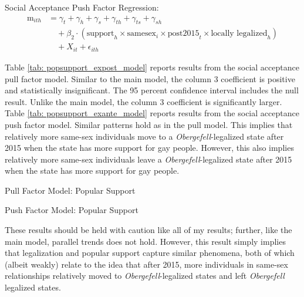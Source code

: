 \documentclass[12pt,letterpaper]{article}
\begin{document}
\hfill
\break
Social Acceptance Push Factor Regression:
\begin{equation}
\begin{aligned}
\text{m}_{ith} &= \gamma_t + \gamma_h + \gamma_s + \gamma_{th} + \gamma_{ts} + \gamma_{sh} \\
&\quad + \beta_2 \cdot (\text{support}_h \times \text{samesex}_i \times \text{post2015}_t \times \text{locally legalized}_h) \\
&\quad + X_{it} + \epsilon_{ith}
\end{aligned}
\end{equation}

Table \ref{tab: popsupport_expost_model} reports results from the social acceptance pull factor model. Similar to the main model, the column 3 coefficient is positive and statistically insignificant. The 95 percent confidence interval includes the null result. Unlike the main model, the column 3 coefficient is significantly larger. Table \ref{tab: popsupport_exante_model} reports results from the social acceptance push factor model. Similar patterns hold as in the pull model. This implies that relatively more same-sex individuals move to a \textit{Obergefell}-legalized state after 2015 when the state has more support for gay people. However, this also implies relatively more same-sex individuals leave a \textit{Obergefell}-legalized state after 2015 when the state has more support for gay people. 

\begin{table}[htbp] %
    \centering
    \caption{Pull Factor Model: Popular Support}
    \label{tab: popsupport_expost_model}
    
\end{table}
\begin{table}[htbp]
    \centering
    \caption{Push Factor Model: Popular Support}
    \label{tab: popsupport_exante_model}
    
\end{table}

These results should be held with caution like all of my results; further, like the main model, parallel trends does not hold. However, this result simply implies that legalization and popular support capture similar phenomena, both of which (albeit weakly) relate to the idea that after 2015, more individuals in same-sex relationships relatively moved to \textit{Obergefell}-legalized states and left \textit{Obergefell} legalized states.
\end{document}
